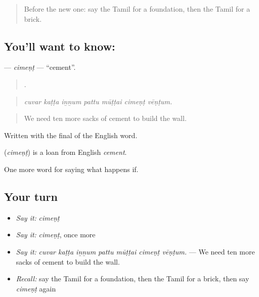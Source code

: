 \label{lesson:TA-C550-ciment}



\begin{quote}
Before the new one: say the Tamil for a foundation, then the Tamil for a brick.
\end{quote}

\subsection*{You'll want to know: }
\textbf{} — \emph{cimeṇṭ} — \textquotedblleft{}cement\textquotedblright{}.

\begin{quote}
      .
\end{quote}

\begin{quote}
\emph{cuvar kaṭṭa iṉṉum pattu mūṭṭai cimeṇṭ vēṇṭum.}
\end{quote}

\begin{quote}
We need ten more sacks of cement to build the wall.
\end{quote}

Written with the final  of the English word.

\begin{cousinweb}
\textbf{} (\emph{cimeṇṭ}) is a loan from English \emph{cement}.
\end{cousinweb}

\begin{grammarlens}[title={What you've built}]
One more word for saying what happens if.
\end{grammarlens}

\subsection*{Your turn}
\begin{itemize}
\raggedright
  \item \emph{Say it:} \emph{cimeṇṭ}
  \item \emph{Say it:} \emph{cimeṇṭ}, once more
  \item \emph{Say it:} \emph{cuvar kaṭṭa iṉṉum pattu mūṭṭai cimeṇṭ vēṇṭum.} — We need ten more sacks of cement to build the wall.
  \item \emph{Recall:} say the Tamil for a foundation, then the Tamil for a brick, then say \emph{cimeṇṭ} again
\end{itemize}

